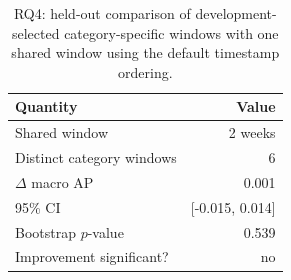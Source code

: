 \begin{table}[ht]
\centering
\caption{RQ4: held-out comparison of development-selected category-specific windows with one shared window using the default timestamp ordering.}
\label{tab:res_rq4_global}
\small
\begin{tabular}{@{}l r@{}}
\toprule
\textbf{Quantity} & \textbf{Value} \\
\midrule
Shared window & 2 weeks \\
Distinct category windows & 6 \\
$\Delta$ macro AP & 0.001 \\
95\% CI & [-0.015, 0.014] \\
Bootstrap $p$-value & 0.539 \\
Improvement significant? & no \\
\bottomrule
\end{tabular}
\end{table}
